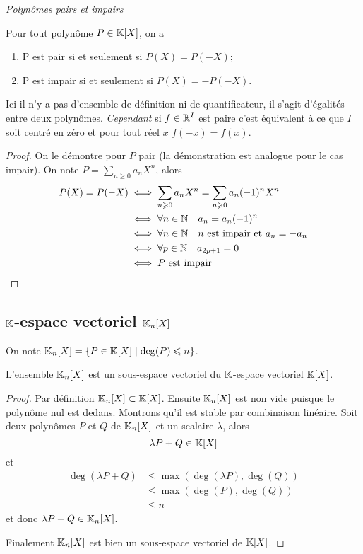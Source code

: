 \emph{Polynômes pairs et impairs}

\begin{prop}
  Pour tout polynôme \(P \in \mathbb{K}[X]\), on a
  \begin{enumerate}
    \item P est pair si et seulement si \(P(X) = P(-X)\);
    \item P est impair si et seulement si \(P(X) = -P(-X)\).
  \end{enumerate}
\end{prop}

\danger Ici il n'y a pas d'ensemble de définition ni de quantificateur, il 
s'agit d'égalités entre deux polynômes. \emph{Cependant} si \(f \in \mathbb{R}^I\) est 
paire c'est équivalent à ce que \(I\) soit centré en zéro et pour tout réel 
\(x\) \(f(-x) = f(x)\).

\begin{proof}
  On le démontre pour \(P\) pair (la démonstration est analogue pour le cas 
  impair). On note \(P = \sum_{n\geqslant 0} a_n X^n\), alors
  \begin{align}
    P(X) = P(-X) &\iff \sum_{n \geqslant 0} a_n X^n = \sum_{n \geqslant 0} a_n 
    (-1)^n X^n\\
    &\iff \forall n \in \mathbb{N} \quad a_n = a_n(-1)^n\\
    &\iff \forall n \in \mathbb{N} \quad n \text{~est impair et~} a_n = -a_n\\
    &\iff \forall p \in \mathbb{N} \quad a_{2p+1} = 0\\
    &\iff P \text{~est impair}
  \end{align}
\end{proof}

\subsection{\(\mathbb{K}\)-espace vectoriel \(\mathbb{K}_n[X]\)}

On note \(\mathbb{K}_n[X] = \left\{P \in \mathbb{K}[X]\mathrel{}\middle|\mathrel{}\deg(P) \leqslant n\right\}\).

\begin{prop}
  L'ensemble \(\mathbb{K}_n[X]\) est un sous-espace vectoriel du \(\mathbb{K}\)-espace vectoriel 
  \(\mathbb{K}[X]\).
\end{prop}
\begin{proof}
  Par définition \(\mathbb{K}_n[X] \subset \mathbb{K}[X]\). Ensuite \(\mathbb{K}_n[X]\) est non vide 
  puisque le polynôme nul est dedans. Montrons qu'il est stable par combinaison 
  linéaire. Soit deux polynômes \(P\) et \(Q\) de \(\mathbb{K}_n[X]\) et un scalaire 
  \(\lambda\), alors
  \begin{equation}
    \lambda P +Q \in \mathbb{K}[X]
  \end{equation}
  et
  \begin{align}
    \deg(\lambda P+Q) &\leqslant \max(\deg(\lambda P),\deg(Q))\\
    &\leqslant \max(\deg(P),\deg(Q))\\
    &\leqslant n
  \end{align}
  et donc \(\lambda P +Q \in \mathbb{K}_n[X]\).

Finalement \(\mathbb{K}_n[X]\) est bien un sous-espace vectoriel de \(\mathbb{K}[X]\). 
\end{proof}

